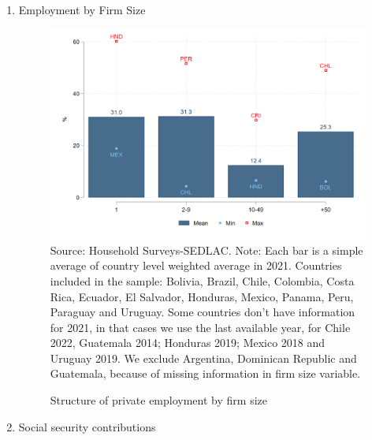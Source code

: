 \documentclass[english]{article}
\begin{document}
\begin{enumerate}
        
\item Employment by Firm Size
\begin{figure}[h!tbp]
        \justifying
        \caption{Structure of private employment by firm size}     
        \includegraphics[scale=.3]{latex/figures/Snapshot/Structure of employment by firm size.png}
        \label{fig:firmsize}
        \footnotesize{Source: Household Surveys-SEDLAC.}
        \footnotesize{Note: Each bar is a simple average of country level weighted average in 2021. Countries included in the sample: Bolivia, Brazil, Chile, Colombia, Costa Rica, Ecuador, El Salvador, Honduras, Mexico, Panama, Peru, Paraguay and Uruguay. Some countries don’t have information for 2021, in that cases we use the last available year, for Chile 2022, Guatemala 2014; Honduras 2019; Mexico 2018 and Uruguay 2019. We exclude Argentina, Dominican Republic and Guatemala, because of missing information in firm size variable.}
        \end{figure}


        
 \item Social security contributions


\end{enumerate}
\end{document}
